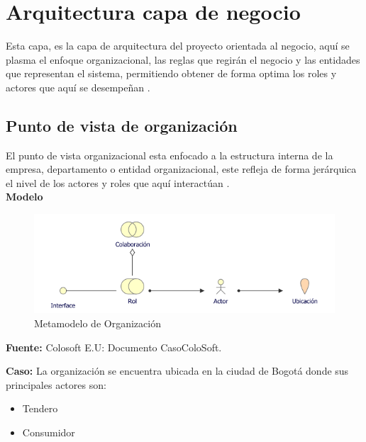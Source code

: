 \section{Arquitectura capa de negocio}
{Esta capa, es la capa de arquitectura del proyecto orientada al negocio, aquí se plasma el enfoque organizacional, las reglas que regirán el negocio y las entidades que representan el sistema, permitiendo obtener de forma optima los roles y actores que aquí se desempeñan \cite{archimate}.}

	\subsection{Punto de vista de organización}
	{ El punto de vista organizacional esta enfocado a la estructura interna de la empresa, departamento o entidad organizacional, este refleja de forma jerárquica el nivel de los actores y roles que aquí interactúan \cite{archimate}.\\
		
		\textbf{Modelo}\\
		\begin{figure}[H]
			\centering
			\includegraphics[width=0.8\linewidth]{development/organizacion.png}
			\caption{Metamodelo de Organización}
		\end{figure}
		\begin{center}
			\textbf{Fuente:} Colosoft E.U: Documento CasoColoSoft.
		\end{center}
	
		\textbf{Caso:} La organización se encuentra ubicada en la ciudad de Bogotá donde sus principales actores son:
		
		\begin{itemize}
			\item Tendero
			\item Consumidor
		\end{itemize}
		
}
